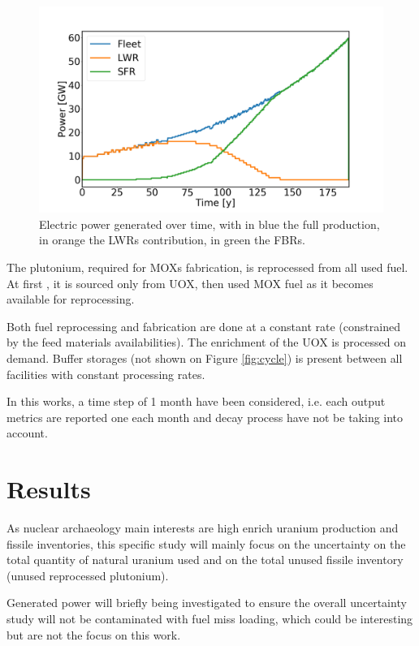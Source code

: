 \documentclass{anstrans}
\begin{document}
\begin{figure}[ht] %
    \centering
    \includegraphics[scale=0.18]{power.png}
    \caption{Electric power generated over time, with in blue the full production,
        in orange the \glspl{LWR} contribution, in green the \glspl{FBR}.}
    \label{fig:power}
\end{figure}


The plutonium, required for \glspl{MOX} fabrication, is reprocessed from all
used fuel.  At first , it is sourced only from UOX, then used MOX fuel as it becomes
available for reprocessing.

Both fuel reprocessing and fabrication are done at a constant rate (constrained
by the feed materials availabilities).  The enrichment of the UOX is processed on
demand.  Buffer storages (not shown on Figure \ref{fig:cycle}) is present between
all facilities with constant processing rates.

In this works, a time step of 1 month have been considered, i.e. each output
metrics are reported one each month and decay process have not be taking into account.

\section{Results}

As nuclear archaeology main interests are high enrich uranium production and
fissile inventories, this specific study will mainly focus on the uncertainty on
the total quantity of natural uranium used and on the total unused fissile
inventory (unused reprocessed plutonium).  

Generated power will briefly being investigated to ensure the overall
uncertainty study will not be contaminated with fuel miss loading, which could
be interesting but are not the focus on this work.
\end{document}
